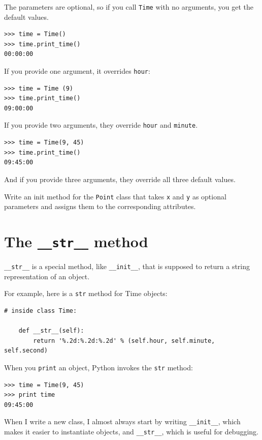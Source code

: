 \documentclass[10pt]{book}
\begin{document}
The parameters are optional, so if you call {\tt Time} with
no arguments, you get the default values.

\begin{verbatim}
>>> time = Time()
>>> time.print_time()
00:00:00
\end{verbatim}
%
If you provide one argument, it overrides {\tt hour}:

\begin{verbatim}
>>> time = Time (9)
>>> time.print_time()
09:00:00
\end{verbatim}
%
If you provide two arguments, they override {\tt hour} and
{\tt minute}.

\begin{verbatim}
>>> time = Time(9, 45)
>>> time.print_time()
09:45:00
\end{verbatim}
%
And if you provide three arguments, they override all three
default values.


\begin{exercise}

Write an init method for the {\tt Point} class that takes
{\tt x} and {\tt y} as optional parameters and assigns
them to the corresponding attributes.
\end{exercise}


\section{The {\tt \_\_str\_\_} method}

\verb"__str__" is a special method, like \verb"__init__",
that is supposed to return a string representation of an object.

For example, here is a {\tt str} method for Time objects:

\begin{verbatim}
# inside class Time:

    def __str__(self):
        return '%.2d:%.2d:%.2d' % (self.hour, self.minute, self.second)
\end{verbatim}
%
When you {\tt print} an object, Python invokes the {\tt str} method:

\begin{verbatim}
>>> time = Time(9, 45)
>>> print time
09:45:00
\end{verbatim}
%
When I write a new class, I almost always start by writing
\verb"__init__", which makes it easier to instantiate objects, and
\verb"__str__", which is useful for debugging.
\end{document}
